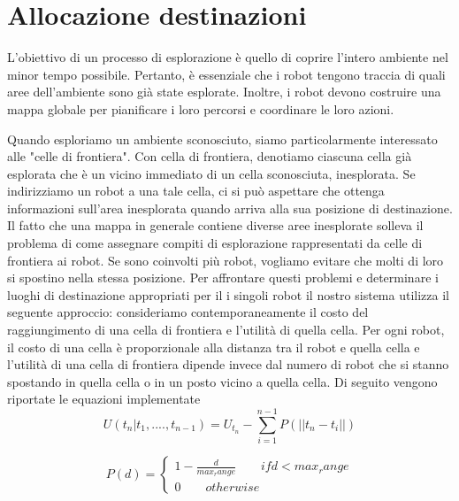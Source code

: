 \section{Allocazione destinazioni}
L'obiettivo di un processo di esplorazione è quello di coprire l'intero ambiente nel minor tempo possibile. Pertanto, è essenziale che i robot tengono traccia di quali aree dell'ambiente sono già state esplorate. Inoltre, i robot devono costruire una mappa globale per pianificare i loro percorsi e coordinare le loro azioni.

Quando esploriamo un ambiente sconosciuto, siamo particolarmente interessato alle "celle di frontiera". 
Con cella di frontiera, denotiamo ciascuna cella già esplorata che è un vicino immediato di un cella sconosciuta, inesplorata. 
Se indirizziamo un robot a una tale cella, ci si può aspettare che ottenga informazioni sull'area inesplorata
quando arriva alla sua posizione di destinazione.
Il fatto che una mappa in generale contiene diverse aree inesplorate solleva il problema di come assegnare compiti di esplorazione rappresentati da celle di frontiera ai robot.
Se sono coinvolti più robot, vogliamo evitare che molti di loro si spostino nella stessa posizione. Per affrontare questi problemi e determinare i luoghi di destinazione appropriati per il i singoli robot il nostro sistema utilizza il seguente approccio: consideriamo contemporaneamente il costo del raggiungimento di una cella di frontiera e l'utilità di quella cella.
Per ogni robot, il costo di una cella è proporzionale alla distanza tra il robot e quella cella e l'utilità di una cella di frontiera dipende invece dal numero di robot che si stanno spostando in quella cella o in un posto vicino a quella cella.
Di seguito vengono riportate le equazioni implementate
\begin{equation}	
\label{eq:componet}
U(t_n|t_1,....,t_{n-1} ) = U_{t_n} -  \sum_{i=1}^{n-1} P(||t_n - t_i ||)
\end{equation}

\begin{equation}	
\label{eq:componet}
P(d) = \begin{cases} 
   1 - \frac{d}{max_range}   \quad \quad if d < max_range \\  0 \quad \quad otherwise
   \end{cases}
\end{equation}


